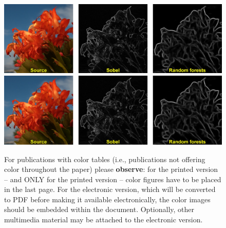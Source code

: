 \documentclass{egpubl}
\begin{document}




%




\newpage


\begin{figure}[tbp]
  \centering
  \mbox{} \hfill
  \includegraphics[width=.3\linewidth]{figs/01.jpg}
  \hfill
  \includegraphics[width=.3\linewidth]{figs/01.jpg}
  \hfill \mbox{}
  \caption{\label{fig:ex3}%
           For publications with color tables (i.e., publications not offering
           color throughout the paper) please \textbf{observe}:
           for the printed version -- and ONLY for the printed
           version -- color figures have to be placed in the last page.
           \newline
           For the electronic version, which will be converted to PDF before
           making it available electronically, the color images should be
           embedded within the document. Optionally, other multimedia
           material may be attached to the electronic version. }
\end{figure}
\end{document}
